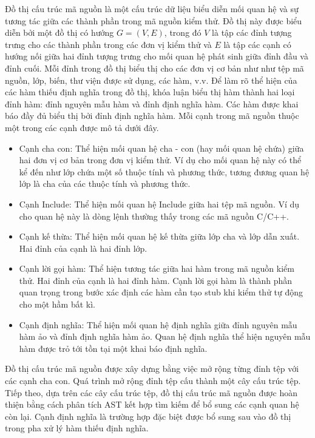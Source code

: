 Đồ thị cấu trúc mã nguồn là một cấu trúc dữ liệu biểu diễn mối quan hệ và sự tương tác giữa các thành phần trong mã nguồn kiểm thử. Đồ thị này được biểu diễn bởi một đồ thị có hướng $G = (V, E)$, trong đó $V$ là tập các đỉnh tượng trưng cho các thành phần trong các đơn vị kiểm thử và $E$ là tập các cạnh có hướng nối giữa hai đỉnh tượng trưng cho mối quan hệ phát sinh giữa đỉnh đầu và đỉnh cuối. Mỗi đỉnh trong đồ thị biểu thị cho các đơn vị cơ bản như như tệp mã nguồn, lớp, biến, thư viện được sử dụng, các hàm, v.v. Để làm rõ thể hiện của các hàm thiếu định nghĩa trong đồ thị, khóa luận biểu thị hàm thành hai loại đỉnh hàm: đỉnh nguyên mẫu hàm và đỉnh định nghĩa hàm. Các hàm được khai báo đầy đủ biểu thị bởi đỉnh định nghĩa hàm. Mỗi cạnh trong mã nguồn thuộc một trong các cạnh được mô tả dưới đây.
\begin{itemize}
    \item Cạnh cha con: Thể hiện mối quan hệ cha - con (hay mối quan hệ chứa) giữa hai đơn vị cơ bản trong đơn vị kiểm thử. Ví dụ cho mối quan hệ này có thể kể đến như lớp chứa một số thuộc tính và phương thức, tương đương quan hệ lớp là cha của các thuộc tính và phương thức.
    \item Cạnh Include: Thể hiện mối quan hệ Include giữa hai tệp mã nguồn. Ví dụ cho quan hệ này là dòng lệnh  thường thấy trong các mã nguồn C/C++.
    \item Cạnh kế thừa: Thể hiện mối quan hệ kế thừa giữa lớp cha và lớp dẫn xuất. Hai đỉnh của cạnh là hai đỉnh lớp.
    \item Cạnh lời gọi hàm: Thể hiện tương tác giữa hai hàm trong mã nguồn kiểm thử. Hai đỉnh của cạnh là hai đỉnh hàm. Cạnh lời gọi hàm là thành phần quan trọng trong bước xác định các hàm cần tạo stub khi kiểm thử tự động cho một hầm bất kì.
    \item Cạnh định nghĩa: Thể hiện mối quan hệ định nghĩa giữa đỉnh nguyên mẫu hàm ảo và đỉnh định nghĩa hàm ảo. Quan hệ định nghĩa thể hiện nguyên mẫu hàm được trỏ tới tồn tại một khai báo định nghĩa.
\end{itemize}

Đồ thị cấu trúc mã nguồn được xây dựng bằng việc mở rộng từng đỉnh tệp với các cạnh cha con. Quá trình mở rộng đỉnh tệp cấu thành một cây cấu trúc tệp. Tiếp theo, dựa trên các cây cấu trúc tệp, đồ thị cấu trúc mã nguồn được hoàn thiện bằng cách phân tích AST kết hợp tìm kiếm để bổ sung các cạnh quan hệ còn lại. Cạnh định nghĩa là trường hợp đặc biệt được bổ sung sau vào đồ thị trong pha xử lý hàm thiếu định nghĩa.

